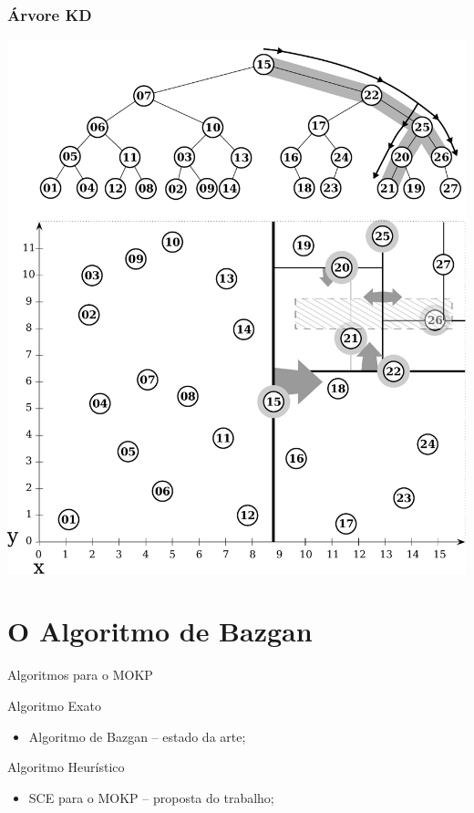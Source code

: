 \documentclass[10pt,xcolor=table,fleqn]{beamer}
\newcommand{\mytitle}[1]{
  \begin{center}
    \color{defblue}
    { \LARGE #1 }
  \end{center}
}
\begin{document}
\begin{frame}
  \frametitle{Árvore KD}
  \begin{center}
    \includegraphics[scale=0.3]{../img/points-query/kdt/points-kdt-query}
  \end{center}
\end{frame}

\section{O Algoritmo de Bazgan}

\begin{frame}
  \mytitle{Algoritmos para o MOKP}
\end{frame}

\begin{frame}
  \begin{block}{Algoritmo Exato}
    \begin{itemize}
      \item Algoritmo de Bazgan -- estado da arte;
    \end{itemize}
  \end{block}
  \begin{block}{Algoritmo Heurístico}
    \begin{itemize}
      \item SCE para o MOKP -- proposta do trabalho;
    \end{itemize}
  \end{block}
\end{frame}
\end{document}
